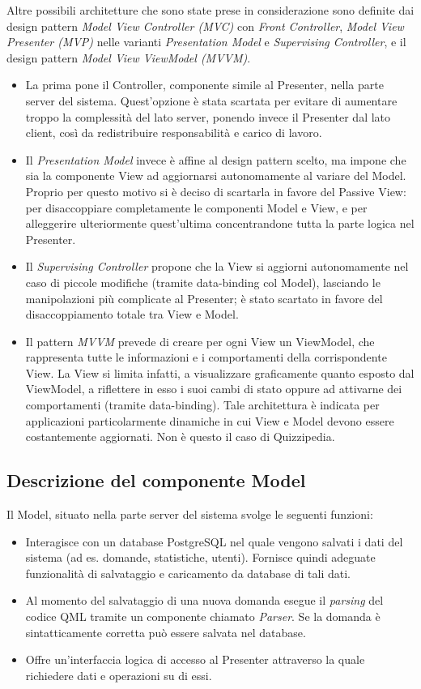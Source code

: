\rigaregistro{0.0.17}{Luca Alessio (Progettista)}{12/05/2016}{Termine stesura sezione diagrammi e revisione/ampliamento di vari paragrafi}\documentclass[a4paper,11pt]{article}
\begin{document}
	Altre possibili architetture che sono state prese in considerazione sono definite dai design pattern \emph{Model View Controller (MVC)} con \emph{Front Controller}, \emph{Model View Presenter (MVP)} nelle varianti \emph{Presentation Model} e \emph{Supervising Controller}, e il design pattern \emph{Model View ViewModel (MVVM)}.
	\begin{itemize}
	\item La prima pone il Controller, componente simile al Presenter, nella parte server del sistema. Quest'opzione è stata scartata per evitare di aumentare troppo la complessità del lato server, ponendo invece il Presenter dal lato client, così da redistribuire responsabilità e carico di lavoro.
	\item Il \emph{Presentation Model} invece è affine al design pattern scelto, ma impone che sia la componente View ad aggiornarsi autonomamente al variare del Model. Proprio per questo motivo si è deciso di scartarla in favore del Passive View: per disaccoppiare completamente le componenti Model e View, e per alleggerire ulteriormente quest'ultima concentrandone tutta la parte logica nel Presenter.
	\item Il \emph{Supervising Controller} propone che la View si aggiorni autonomamente nel caso di piccole modifiche (tramite data-binding col Model), lasciando le manipolazioni più complicate al Presenter; è stato scartato in favore del disaccoppiamento totale tra View e Model.
	\item Il pattern \emph{MVVM} prevede di creare per ogni View un ViewModel, che rappresenta tutte le informazioni e i comportamenti della corrispondente View. La View si limita infatti, a visualizzare graficamente quanto esposto dal ViewModel, a riflettere in esso i suoi cambi di stato oppure ad attivarne dei comportamenti (tramite data-binding). Tale architettura è indicata per applicazioni particolarmente dinamiche in cui View e Model devono essere costantemente aggiornati. Non è questo il caso di Quizzipedia.
	\end{itemize}
	\subsection{Descrizione del componente Model}
	Il Model, situato nella parte server del sistema svolge le seguenti funzioni:
	\begin{itemize}
		\item Interagisce con un database PostgreSQL nel quale vengono salvati i dati del sistema (ad es. domande, statistiche, utenti). Fornisce quindi adeguate funzionalità di salvataggio e caricamento da database di tali dati.
		\item Al momento del salvataggio di una nuova domanda esegue il \emph{parsing} del codice QML tramite un componente chiamato \emph{Parser}. Se la domanda è sintatticamente corretta può essere salvata nel database.
		\item Offre un'interfaccia logica di accesso al Presenter attraverso la quale richiedere dati e operazioni su di essi.
	\end{itemize}
\end{document}
